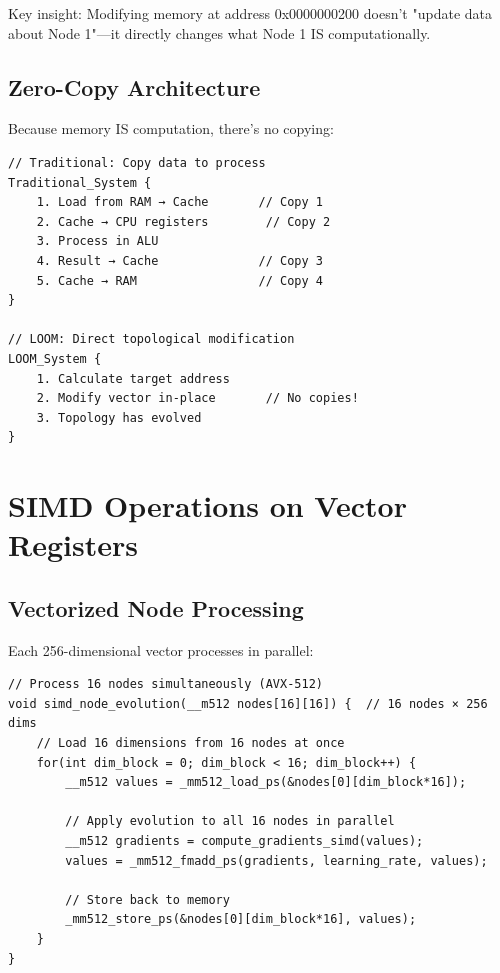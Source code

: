 \documentclass[12pt,a4paper,openany]{book} %
\begin{document}
Key insight: Modifying memory at address 0x0000000200 doesn't "update data about Node 1"—it directly changes what Node 1 IS computationally.

\subsection{Zero-Copy Architecture}

Because memory IS computation, there's no copying:

\vspace{0.5em}
\begin{lstlisting}[style=cpp]
// Traditional: Copy data to process
Traditional_System {
    1. Load from RAM → Cache       // Copy 1
    2. Cache → CPU registers        // Copy 2
    3. Process in ALU
    4. Result → Cache              // Copy 3
    5. Cache → RAM                 // Copy 4
}

// LOOM: Direct topological modification
LOOM_System {
    1. Calculate target address
    2. Modify vector in-place       // No copies!
    3. Topology has evolved
}
\end{lstlisting}
\vspace{0.5em}

\section{SIMD Operations on Vector Registers}

\subsection{Vectorized Node Processing}

Each 256-dimensional vector processes in parallel:

\vspace{0.5em}
\begin{lstlisting}[style=cpp]
// Process 16 nodes simultaneously (AVX-512)
void simd_node_evolution(__m512 nodes[16][16]) {  // 16 nodes × 256 dims
    // Load 16 dimensions from 16 nodes at once
    for(int dim_block = 0; dim_block < 16; dim_block++) {
        __m512 values = _mm512_load_ps(&nodes[0][dim_block*16]);

        // Apply evolution to all 16 nodes in parallel
        __m512 gradients = compute_gradients_simd(values);
        values = _mm512_fmadd_ps(gradients, learning_rate, values);

        // Store back to memory
        _mm512_store_ps(&nodes[0][dim_block*16], values);
    }
}
\end{lstlisting}
\vspace{0.5em}
\end{document}
